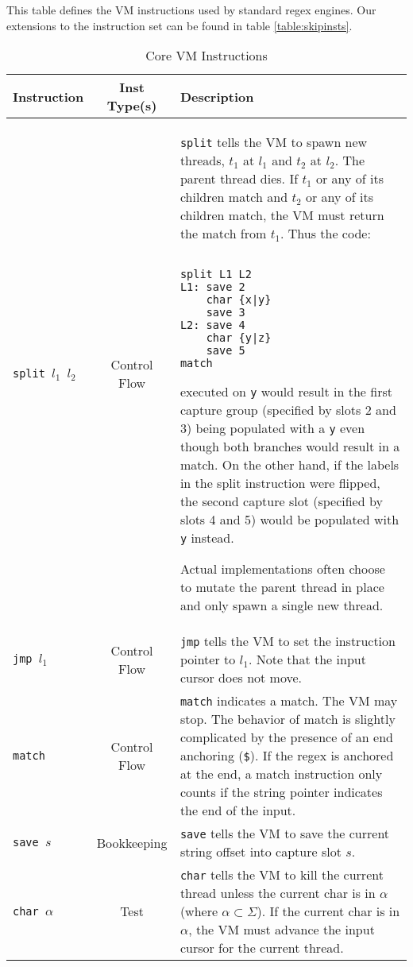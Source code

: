 \begin{table}[ht]
\centering
\caption{Core VM Instructions}
\label{table:insts}

This table defines the VM instructions used by standard regex engines.
Our extensions to the instruction set can be found in table
\ref{table:skipinsts}.
\begin{tabular}{| l | c | p{9cm} |} \hline
Instruction & Inst Type(s) & Description \\ \hline
{\tt split $l_1$ $l_2$} & Control Flow &
    \verb'split' tells the VM to spawn new threads, $t_1$ at $l_1$ 
    and $t_2$ at $l_2$. The parent thread dies.
    If $t_1$ or any of its children match and
    $t_2$ or any of its children match, the VM must return
    the match from $t_1$. Thus the code:
        \begin{verbatim}

split L1 L2
L1: save 2
    char {x|y}
    save 3
L2: save 4
    char {y|z}
    save 5
match
        \end{verbatim}
    executed on \verb'y' would result in the first capture group
    (specified by slots 2 and 3) being populated with a \verb'y'
    even though both branches would result in a match. On the
    other hand, if the labels in the split instruction were
    flipped, the second capture slot (specified by slots 4 and 5)
    would be populated with \verb'y' instead.

    Actual implementations often choose to mutate the parent thread in
    place and only spawn a single new thread.
    \\ \hline
{\tt jmp $l_1$} & Control Flow &
    \verb'jmp' tells the VM to set the instruction pointer
    to $l_1$. Note that the input cursor does not move. \\ \hline
{\tt match} & Control Flow &
    \verb'match' indicates a match. The VM may stop. The behavior of match
    is slightly complicated by the presence of an end anchoring
    (\verb'$'). If the regex is anchored at the end, a match instruction
    only counts if the string pointer indicates the end of the input.
    \\ \hline
{\tt save $s$} & Bookkeeping &
    \verb'save' tells the VM to save the current string
    offset into capture slot $s$. \\ \hline
{\tt char $\alpha$} & Test &
    \verb'char' tells the VM to kill the current thread unless
    the current char is in $\alpha$ (where $\alpha \subset \Sigma$).
    If the current char is in $\alpha$, the VM must advance the input cursor
    for the current thread. \\ \hline
\end{tabular}
\end{table}




